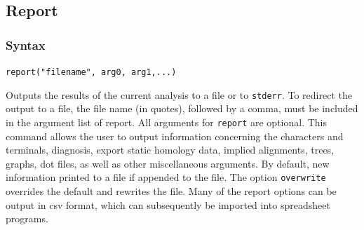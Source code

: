 \subsection{Report}
	\subsubsection{Syntax}
		\texttt{report("filename", arg0, arg1,...)}
	
	\begin{phygdescription}
		{Outputs the results of the current analysis to a file or to \texttt{stderr}. To redirect the 
		output to a file, the file name (in quotes), followed by a comma, must be included in 
		the argument list of report. All arguments for \texttt{report} are optional. This command 
		allows the user to output information concerning the characters and terminals, 
		diagnosis, export static homology data, implied alignments, trees, graphs, dot files, 
		as well as other miscellaneous arguments. By default, new information printed to 
		a file if appended to the file. The option \texttt{overwrite} overrides the default and 
		rewrites the file. Many of the report options can be output in csv format,  which can
		subsequently be imported into spreadsheet programs.}
	\end{phygdescription}
	
